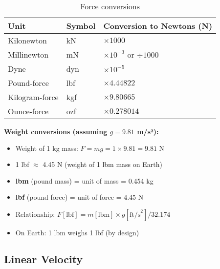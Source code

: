 \begin{table}[H]
\centering
\begin{tabular}{|l|l|l|}
\hline
\rowcolor{blue!20}
\textbf{Unit} & \textbf{Symbol} & \textbf{Conversion to Newtons (N)} \\
\hline
Kilonewton & kN & $\times 1000$ \\
\hline
Millinewton & mN & $\times 10^{-3}$ or $\div 1000$ \\
\hline
Dyne & dyn & $\times 10^{-5}$ \\
\hline
\rowcolor{yellow!20}
Pound-force & lbf & $\times 4.44822$ \\
\hline
\rowcolor{yellow!20}
Kilogram-force & kgf & $\times 9.80665$ \\
\hline
\rowcolor{yellow!20}
Ounce-force & ozf & $\times 0.278014$ \\
\hline
\end{tabular}
\caption{Force conversions}
\end{table}

\textbf{Weight conversions (assuming $g = 9.81$ m/s²):}
\begin{itemize}
    \item Weight of 1 kg mass: $F = mg = 1 \times 9.81 = 9.81$ N
    \item 1 lbf $\approx$ 4.45 N (weight of 1 lbm mass on Earth)
\end{itemize}

\begin{tcolorbox}[colback=orange!10!white,colframe=orange!75!black,title= Common Confusion: lbm vs lbf]
\begin{itemize}
    \item \textbf{lbm} (pound mass) = unit of mass = 0.454 kg
    \item \textbf{lbf} (pound force) = unit of force = 4.45 N
    \item Relationship: $F[\text{lbf}] = m[\text{lbm}] \times g[\text{ft/s}^2] / 32.174$
    \item On Earth: 1 lbm weighs 1 lbf (by design)
\end{itemize}
\end{tcolorbox}

\subsection{Linear Velocity}

